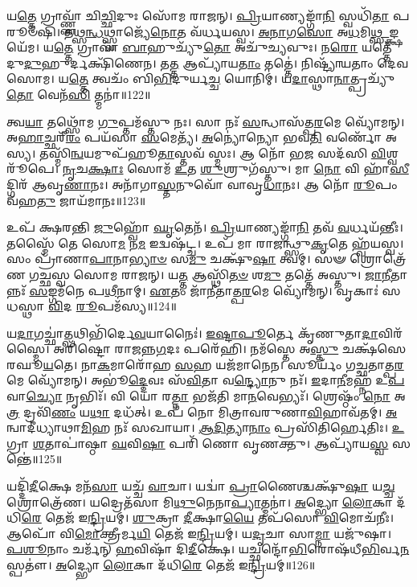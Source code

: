 𑌯\-\ul{𑌤𑍍𑌤𑍇} 𑌗𑍍𑌰𑌾𑌵𑍍𑌣𑍍𑌣𑌾᳴ 𑌚𑌿\-\ul{𑌚𑍍𑌛𑌿}\-𑌦𑍁𑌃 𑌸𑍋᳴𑌮 𑌰𑌾𑌜𑌨𑍍।
\-\ul{𑌪𑍍𑌰𑌿}\-𑌯𑌾𑌣𑍍𑌯𑌙𑍍𑌗𑌾᳴\-\ul{𑌨𑌿} 𑌸𑍍𑌵𑌧𑌿᳴\-\ul{𑌤𑌾} 𑌪𑌰𑍂𑍞᳴𑌷𑌿।
𑌤𑌥𑍍𑌸\-\ul{𑌨𑍍𑌧}\-𑌥𑍍𑌸𑍍𑌵𑌾𑌜𑍍𑌯𑍇᳴\-\ul{𑌨𑍋}\-𑌤 𑌵᳴𑌰𑍍𑌧𑌯𑌸𑍍𑌵।
\-\ul{𑌅}\-\-\ul{𑌨𑌾}\-𑌗\-\ul{𑌸𑍋} 𑌅\-\ul{𑌧}\-𑌮𑌿\-\ul{𑌥𑍍𑌸}\-𑌙𑍍𑌕𑍍𑌷𑌯𑍇᳴𑌮।
𑌯\-\ul{𑌤𑍍𑌤𑍇} 𑌗𑍍𑌰𑌾𑌵𑌾᳴ \ul{𑌬𑌾}\-𑌹𑍁𑌚𑍍𑌯𑍁᳴\-\ul{𑌤𑍋} 𑌅𑌚𑍁᳴𑌚𑍍𑌯𑌵𑍁𑌃।
𑌨\-\ul{𑌰𑍋} 𑌯𑌤𑍍𑌤𑍇᳴ 𑌦𑍁\-\ul{𑌦𑍁}\-𑌹𑍁𑌰𑍍𑌦𑌕𑍍𑌷𑌿᳴𑌣𑍇𑌨।
𑌤\-\ul{𑌤𑍍𑌤} 𑌆𑌪𑍍𑌯𑌾᳴𑌯\-\ul{𑌤𑌾𑌂} 𑌤𑌤𑍍𑌤𑍇॑।
𑌨𑌿𑌷𑍍𑌟𑍍𑌯𑌾᳴𑌯𑌤𑌾𑌂 𑌦𑍇𑌵 𑌸𑍋𑌮।
𑌯\-\ul{𑌤𑍍𑌤𑍇} 𑌤𑍍𑌵𑌚𑌂᳴ 𑌬𑌿\-\ul{𑌭𑌿}\-𑌦𑍁𑌰𑍍𑌯\-\ul{𑌚𑍍𑌚} 𑌯𑍋𑌨𑌿𑌮𑍍॑।
𑌯\-\ul{𑌦𑌾}\-𑌸𑍍𑌥𑌾\-\ul{𑌨𑌾}\-𑌤𑍍𑌪𑍍𑌰𑌚𑍍𑌯𑍁᳴\-\ul{𑌤𑍋} 𑌵𑍇𑌨᳴\-\ul{𑌸𑌿} 𑌤𑍍𑌮𑌨𑌾॑॥122॥

𑌤𑍍𑌵\-\ul{𑌯𑌾} 𑌤𑌥𑍍𑌸𑍋᳴𑌮 \ul{𑌗𑍁}\-𑌪𑍍𑌤𑌮᳴𑌸𑍍𑌤𑍁 𑌨𑌃।
𑌸𑌾 𑌨𑌃᳴ \ul{𑌸}\-𑌨𑍍𑌧𑌾𑌸᳴𑌤𑍍𑌪\-\ul{𑌰}\-𑌮𑍇 𑌵𑍍𑌯𑍋᳴𑌮𑌨𑍍।
𑌅\-\ul{𑌹𑌾}\-𑌚𑍍𑌛𑌰𑍀᳴\-\ul{𑌰𑌂} 𑌪𑌯᳴𑌸𑌾 \ul{𑌸}\-𑌮𑍇𑌤𑍍𑌯᳴।
\-\ul{𑌅}\-𑌨𑍍𑌯𑍋॑𑌨𑍍𑌯𑍋 𑌭𑌵\-\ul{𑌤𑌿} 𑌵𑌰𑍍𑌣𑍋᳴ 𑌅𑌸𑍍𑌯।
𑌤𑌸𑍍𑌮𑌿᳴\-\ul{𑌨𑍍𑌵}\-𑌯𑌮𑍁𑌪᳴𑌹𑍂\-\ul{𑌤𑌾}\-𑌸𑍍𑌤𑌵᳴ 𑌸𑍍𑌮𑌃।
𑌆 𑌨𑍋᳴ 𑌭\-\ul{𑌜} 𑌸𑌦᳴𑌸𑌿 \ul{𑌵𑌿}\-𑌶𑍍𑌵𑌰𑍂᳴𑌪𑍇।
\-\ul{𑌨𑍃}\-𑌚\-\ul{𑌕𑍍𑌷𑌾𑌃} 𑌸𑍋𑌮᳴ \ul{𑌉}\-𑌤 \ul{𑌶𑍁}\-𑌶𑍍𑌰𑍁𑌗᳴𑌸𑍍𑌤𑍁।
𑌮𑌾 \ul{𑌨𑍋} 𑌵𑌿 𑌹𑌾᳴\-\ul{𑌸𑍀}\-𑌦𑍍𑌗𑌿𑌰᳴ 𑌆𑌵𑍃\-\ul{𑌣𑌾}\-𑌨𑌃।
𑌅𑌨𑌾᳴𑌗𑌾\-\ul{𑌸𑍍𑌤}\-𑌨𑍁𑌵𑍋᳴ 𑌵𑌾𑌵𑍃\-\ul{𑌧𑌾}\-𑌨𑌃।
𑌆 𑌨𑍋᳴ \ul{𑌰𑍂}\-𑌪𑌂 𑌵᳴𑌹\-\ul{𑌤𑍁} 𑌜𑌾𑌯᳴𑌮𑌾𑌨𑌃॥123॥

𑌉𑌪᳴ 𑌕𑍍𑌷𑌰𑌨𑍍𑌤𑌿 \ul{𑌜𑍁}\-𑌹𑍍𑌵𑍋᳴ \ul{𑌘𑍃}\-𑌤𑍇𑌨᳴।
\-\ul{𑌪𑍍𑌰𑌿}\-𑌯𑌾𑌣𑍍𑌯𑌙𑍍𑌗𑌾᳴\-\ul{𑌨𑌿} 𑌤𑌵᳴ \ul{𑌵}\-𑌰𑍍𑌧𑌯᳴𑌨𑍍𑌤𑍀𑌃।
𑌤𑌸𑍍𑌮𑍈᳴ 𑌤𑍇 𑌸𑍋\-\ul{𑌮} 𑌨\-\ul{𑌮} 𑌇𑌦𑍍𑌵𑌷᳴𑌟𑍍𑌚।
𑌉𑌪᳴ 𑌮𑌾 𑌰𑌾𑌜𑌨𑍍𑌥𑍍𑌸𑍁\-\ul{𑌕𑍃}\-𑌤𑍇 𑌹𑍍𑌵᳴𑌯𑌸𑍍𑌵।
𑌸𑌂 𑌪𑍍𑌰𑌾᳴𑌣𑌾\-\ul{𑌪𑌾}\-𑌨𑌾\-\ul{𑌭𑍍𑌯𑌾}\-\-\ul{𑍞} 𑌸\-\ul{𑌮𑍁} 𑌚𑌕𑍍𑌷𑍁᳴\-\ul{𑌷𑌾} 𑌤𑍍𑌵𑌮𑍍।
𑌸𑍟 𑌶𑍍𑌰𑍋𑌤𑍍𑌰𑍇᳴𑌣 𑌗𑌚𑍍𑌛𑌸𑍍𑌵 𑌸𑍋𑌮 𑌰𑌾𑌜𑌨𑍍।
𑌯\-\ul{𑌤𑍍𑌤} 𑌆𑌸𑍍𑌥𑌿᳴\-\ul{𑌤}\-\-\ul{𑍞} 𑌶\-\ul{𑌮𑍁} 𑌤𑌤𑍍𑌤𑍇᳴ 𑌅𑌸𑍍𑌤𑍁।
\-\ul{𑌜𑌾}\-\-\ul{𑌨𑍀}\-𑌤𑌾𑌨𑍍𑌨𑌃᳴ \ul{𑌸}\-𑌙𑍍𑌗𑌮᳴𑌨𑍇 𑌪\-\ul{𑌥𑍀}\-𑌨𑌾𑌮𑍍।
\-\ul{𑌏}\-𑌤𑌂 𑌜𑌾᳴𑌨𑍀𑌤𑌾𑌤𑍍𑌪\-\ul{𑌰}\-𑌮𑍇 𑌵𑍍𑌯𑍋᳴𑌮𑌨𑍍।
𑌵𑍃𑌕𑌾𑌃॑ 𑌸𑌧𑌸𑍍𑌥𑌾 \ul{𑌵𑌿}\-𑌦 \ul{𑌰𑍂}\-𑌪𑌮᳴𑌸𑍍𑌯॥124॥

𑌯\-\ul{𑌦𑌾}\-𑌗𑌚𑍍𑌛𑌾॑\-\ul{𑌤𑍍𑌪}\-𑌥𑌿𑌭𑌿᳴𑌰𑍍𑌦𑍇\-\ul{𑌵}\-𑌯𑌾𑌨𑍈𑌃॑।
\-\ul{𑌇}\-\-\ul{𑌷𑍍𑌟𑌾}\-\-\ul{𑌪𑍂}\-𑌰𑍍𑌤𑍇 𑌕𑍃᳴𑌣𑍁𑌤𑌾\-\ul{𑌦𑌾}\-𑌵𑌿𑌰᳴𑌸𑍍𑌮𑍈।
𑌅𑌰𑌿᳴𑌷𑍍𑌟𑍋 𑌰𑌾𑌜𑌨𑍍𑌨\-\ul{𑌗}\-𑌦𑌃 𑌪𑌰𑍇᳴𑌹𑌿।
𑌨𑌮᳴𑌸𑍍𑌤𑍇 𑌅\-\ul{𑌸𑍍𑌤𑍁} 𑌚𑌕𑍍𑌷᳴𑌸𑍇 𑌰𑌘𑍂\-\ul{𑌯}\-𑌤𑍇।
𑌨𑌾\-\ul{𑌕}\-𑌮𑌾𑌰𑍋᳴𑌹 \ul{𑌸}\-𑌹 𑌯𑌜᳴𑌮𑌾𑌨𑍇𑌨।
𑌸𑍂𑌰𑍍𑌯𑌂᳴ 𑌗𑌚𑍍𑌛𑌤𑌾𑌤𑍍𑌪\-\ul{𑌰}\-𑌮𑍇 𑌵𑍍𑌯𑍋᳴𑌮𑌨𑍍।
𑌅𑌭𑍂॑\-\ul{𑌦𑍍𑌦𑍇}\-𑌵𑌃 𑌸᳴\-\ul{𑌵𑌿}\-𑌤𑌾 𑌵\-\ul{𑌨𑍍𑌦𑍍𑌯𑍋}\-𑌨𑍁 𑌨𑌃᳴।
\-\ul{𑌇}\-𑌦𑌾\-\ul{𑌨𑍀}\-𑌮𑌹𑍍𑌨᳴ 𑌉\-\ul{𑌪}\-𑌵𑌾\-\ul{𑌚𑍍𑌯𑍋} 𑌨𑍃𑌭𑌿𑌃᳴।
𑌵𑌿 𑌯𑍋 𑌰\-\ul{𑌤𑍍𑌨𑌾} 𑌭𑌜᳴𑌤𑌿 𑌮𑌾\-\ul{𑌨}\-𑌵𑍇𑌭𑍍𑌯𑌃᳴।
𑌶𑍍𑌰𑍇𑌷𑍍𑌠𑌂᳴ \ul{𑌨𑍋} 𑌅\-\ul{𑌤𑍍𑌰} 𑌦𑍍𑌰𑌵𑌿᳴\-\ul{𑌣𑌂} 𑌯\-\ul{𑌥𑌾} 𑌦𑌧᳴𑌤𑍍।
𑌉𑌪᳴ 𑌨𑍋 𑌮𑌿𑌤𑍍𑌰𑌾𑌵𑌰𑍁𑌣𑌾\-\ul{𑌵𑌿}\-𑌹𑌾𑌵᳴𑌤𑌮𑍍।
\-\ul{𑌅}\-𑌨𑍍𑌵𑌾𑌦𑍀॑𑌧𑍍𑌯𑌾𑌥𑌾\-\ul{𑌮𑌿}\-𑌹 𑌨𑌃᳴ 𑌸𑌖𑌾𑌯𑌾।
\-\ul{𑌆}\-\-\ul{𑌦𑌿}\-𑌤𑍍𑌯𑌾\-\ul{𑌨𑌾𑌂} 𑌪𑍍𑌰𑌸𑌿᳴𑌤𑌿𑌰𑍍\mbox{}\-\ul{𑌹𑍇}\-𑌤𑌿𑌃।
\-\ul{𑌉}\-𑌗𑍍𑌰𑌾 \ul{𑌶}\-𑌤𑌾𑌪𑌾॑𑌷𑍍𑌠𑌾 \ul{𑌘}\-𑌵𑌿\-\ul{𑌷𑌾} 𑌪𑌰𑌿᳴ 𑌣𑍋 𑌵𑍃𑌣𑌕𑍍𑌤𑍁।
𑌆𑌪𑍍𑌯𑌾᳴𑌯\-\ul{𑌸𑍍𑌵} 𑌸𑌨𑍍𑌤𑍇॑॥125॥\anuvakamend[𑌤𑍍𑌮\-\ul{𑌨𑌾} 𑌜𑌾𑌯᳴𑌮𑌾𑌨𑍋\-𑌽\-\ul{𑌸𑍍𑌯} 𑌦\-\ul{𑌧}\-𑌤𑍍𑌪𑌞𑍍𑌚᳴ 𑌚]

𑌯𑌦𑍍𑌦𑌿᳴\-\ul{𑌦𑍀}\-𑌕𑍍𑌷𑍇 𑌮𑌨᳴\-\ul{𑌸𑌾} 𑌯𑌚𑍍𑌚᳴ \ul{𑌵𑌾}\-𑌚𑌾।
𑌯𑌦𑍍𑌵𑌾॑ \ul{𑌪𑍍𑌰𑌾}\-𑌣𑍈𑌶𑍍𑌚𑌕𑍍𑌷𑍁᳴\-\ul{𑌷𑌾} 𑌯\-\ul{𑌚𑍍𑌚} 𑌶𑍍𑌰𑍋𑌤𑍍𑌰𑍇᳴𑌣।
𑌯𑌦𑍍𑌰𑍇𑌤᳴𑌸𑌾 𑌮𑌿\-\ul{𑌥𑍁}\-𑌨𑍇𑌨𑌾\-\ul{𑌪𑍍𑌯𑌾}\-𑌤𑍍𑌮𑌨𑌾॑।
\-\ul{𑌅}\-𑌦𑍍𑌭𑍍𑌯𑍋 \ul{𑌲𑍋}\-𑌕𑌾 𑌦᳴𑌧𑌿\-\ul{𑌰𑍇} 𑌤𑍇𑌜᳴ 𑌇\-\ul{𑌨𑍍𑌦𑍍𑌰𑌿}\-𑌯𑌮𑍍।
\-\ul{𑌶𑍁}\-𑌕𑍍𑌰𑌾 \ul{𑌦𑍀}\-𑌕𑍍𑌷𑌾\-\ul{𑌯𑍈} 𑌤𑌪᳴𑌸𑍋 \ul{𑌵𑌿}\-𑌮𑍋𑌚᳴𑌨𑍀𑌃।
𑌆𑌪𑍋᳴ 𑌵𑌿\-\ul{𑌮𑍋}\-𑌕𑍍𑌤𑍍𑌰𑍀𑌰𑍍𑌮\-\ul{𑌯𑌿} 𑌤𑍇𑌜᳴ 𑌇\-\ul{𑌨𑍍𑌦𑍍𑌰𑌿}\-𑌯𑌮𑍍।
𑌯\-\ul{𑌦𑍃}\-𑌚𑌾 𑌸𑌾\-\ul{𑌮𑍍𑌨𑌾} 𑌯𑌜𑍁᳴𑌷𑌾।
\-\ul{𑌪}\-\-\ul{𑌶𑍂}\-𑌨𑌾𑌂 𑌚𑌰𑍍𑌮᳴𑌨𑍍 \ul{𑌹}\-𑌵𑌿𑌷𑌾᳴ 𑌦𑌿\-\ul{𑌦𑍀}\-𑌕𑍍𑌷𑍇।
𑌯𑌚𑍍𑌛𑌨𑍍𑌦𑍋᳴\-\ul{𑌭𑌿}\-𑌰𑍋𑌷᳴𑌧𑍀\-\ul{𑌭𑌿}\-𑌰𑍍𑌵\-\ul{𑌨}\-𑌸𑍍𑌪𑌤𑍗॑।
\-\ul{𑌅}\-𑌦𑍍𑌭𑍍𑌯𑍋 \ul{𑌲𑍋}\-𑌕𑌾 𑌦᳴𑌧𑌿\-\ul{𑌰𑍇} 𑌤𑍇𑌜᳴ 𑌇\-\ul{𑌨𑍍𑌦𑍍𑌰𑌿}\-𑌯𑌮𑍍॥126॥

